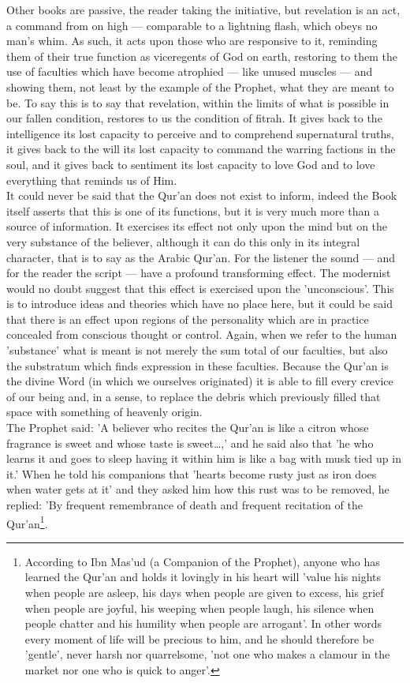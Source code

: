 \documentclass[11pt, b5paper, twoside]{book}
\begin{document}
Other books are passive, the reader taking the initiative, but revelation is an act, a command from 
on high --- comparable to a lightning flash, which obeys no man's whim. As such, it acts upon those who 
are responsive to it, reminding them of their true function as viceregents of God on earth, restoring 
to them the use of faculties which have become atrophied --- like unused muscles --- and showing them, not least by the example of the Prophet, what they are meant to be. To say this is to say that 
revelation, within the limits of what is possible in our fallen condition, restores to us the 
condition of fitrah. It gives back to the intelligence its lost capacity to perceive and to 
comprehend supernatural truths, it gives back to the will its lost capacity to command the warring 
factions in the soul, and it gives back to sentiment its lost capacity to love God and to love 
everything that reminds us of Him. \\

It could never be said that the Qur'an does not exist to inform, indeed the Book itself asserts that 
this is one of its functions, but it is very much more than a source of information. It exercises its 
effect not only upon the mind but on the very substance of the believer, although it can do this only 
in its integral character, that is to say as the Arabic Qur'an. For the listener the sound --- and for 
the reader the script --- have a profound transforming effect. The modernist would no doubt suggest 
that this effect is exercised upon the 'unconscious'. This is to introduce ideas and theories which 
have no place here, but it could be said that there is an effect upon regions of the personality 
which are in practice concealed from conscious thought or control. Again, when we refer to the human 
'substance' what is meant is not merely the sum total of our faculties, but also the substratum which 
finds expression in these faculties. Because the Qur'an is the divine Word (in which we ourselves 
originated) it is able to fill every crevice of our being and, in a sense, to replace the debris 
which previously filled that space with something of heavenly origin. \\

The Prophet said: 'A believer who recites the Qur'an is like a citron whose fragrance is sweet and 
whose taste is sweet\ldots{},' and he said also that 'he who learns it and goes to sleep having it within 
him is like a bag with musk tied up in it.' When he told his companions that 'hearts become rusty 
just as iron does when water gets at it' and they asked him how this rust was to be removed, he 
replied: 'By frequent remembrance of death and frequent recitation of the Qur'an\footnote{According to Ibn Mas'ud (a Companion of the Prophet), anyone who has learned the Qur'an and holds 
it lovingly in his heart will 'value his nights when people are asleep, his days when people are 
given to excess, his grief when people are joyful, his weeping when people laugh, his silence when 
people chatter and his humility when people are arrogant'. In other words every moment of life will 
be precious to him, and he should therefore be 'gentle', never harsh nor quarrelsome, 'not one who 
makes a clamour in the market nor one who is quick to anger'.}.
\end{document}
